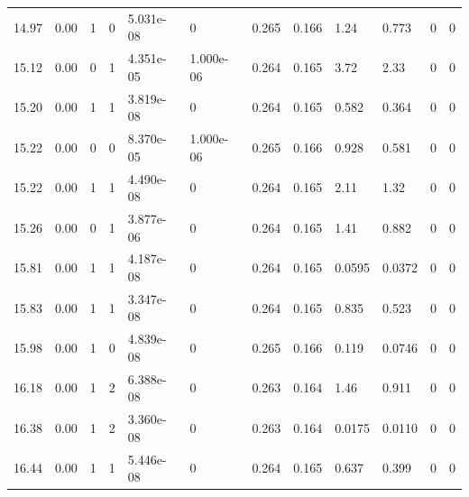 \documentclass[preview]{standalone}
\begin{document}
{{{\begin{tabular}{L{1.2cm}C{1.2cm} C{0.3cm}C{0.5cm} C{1.4cm}C{1.4cm} C{1.4cm}C{1.4cm} C{1.6cm}C{1.6cm} C{1.6cm}C{1.6cm}}
  14.97  &  0.00  & 1     &  0 &  5.031e-08  & 0  &  0.265&   0.166& 1.24 & 0.773   &  0 & 0  \\ 
  15.12  &  0.00  & 0     &  1 &  4.351e-05  & 1.000e-06  &  0.264&   0.165& 3.72 & 2.33   &  0 & 0  \\ 
  15.20  &  0.00  & 1     &  1 &  3.819e-08  & 0  &  0.264&   0.165& 0.582 & 0.364   &  0 & 0  \\ 
  15.22  &  0.00  & 0     &  0 &  8.370e-05  & 1.000e-06  &  0.265&   0.166& 0.928 & 0.581   &  0 & 0  \\ 
  15.22  &  0.00  & 1     &  1 &  4.490e-08  & 0  &  0.264&   0.165& 2.11 & 1.32   &  0 & 0  \\ 
  15.26  &  0.00  & 0     &  1 &  3.877e-06  & 0  &  0.264&   0.165& 1.41 & 0.882   &  0 & 0  \\ 
  15.81  &  0.00  & 1     &  1 &  4.187e-08  & 0  &  0.264&   0.165& 0.0595 & 0.0372   &  0 & 0  \\ 
  15.83  &  0.00  & 1     &  1 &  3.347e-08  & 0  &  0.264&   0.165& 0.835 & 0.523   &  0 & 0  \\ 
  15.98  &  0.00  & 1     &  0 &  4.839e-08  & 0  &  0.265&   0.166& 0.119 & 0.0746   &  0 & 0  \\ 
  16.18  &  0.00  & 1     &  2 &  6.388e-08  & 0  &  0.263&   0.164& 1.46 & 0.911   &  0 & 0  \\ 
  16.38  &  0.00  & 1     &  2 &  3.360e-08  & 0  &  0.263&   0.164& 0.0175 & 0.0110   &  0 & 0  \\ 
  16.44  &  0.00  & 1     &  1 &  5.446e-08  & 0  &  0.264&   0.165& 0.637 & 0.399   &  0 & 0  \\ 
\hline 
\end{tabular} 

}}}
\end{document}
